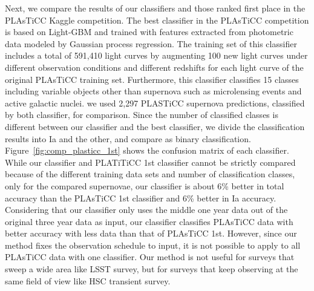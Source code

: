 \documentclass[useamsfonts]{pasj01}
\begin{document}
Next, we compare the results of our classifiers and those ranked first place in the PLAsTiCC Kaggle competition.
The best classifier in the PLAsTiCC competition \citep{Boone_2019} is based on Light-GBM and trained with features extracted from photometric data modeled by Gaussian process regression.
The training set of this classifier includes a total of 591,410 light curves by augmenting 100 new light curves under different observation conditions and different redshifts for each light curve of the original PLAsTiCC training set.
Furthermore, this classifier classifies 15 classes including variable objects other than supernova such as microlensing events and active galactic nuclei.
we used 2,297 PLASTiCC supernova predictions, classified by both classifier, for comparison.
Since the number of classified classes is different between our classifier and the best classifier, we divide the classification results into Ia and the other, and compare as binary classification.
Figure\ \ref{fig:comp_plasticc_1st} shows the confusion matrix of each classifier.
While our classifier and PLATiTiCC 1st classifier cannot be strictly compared because of the different training data sets and number of classification classes,
only for the compared supernovae, our classifier is about 6\% better in total accuracy than the PLAsTiCC 1st classifier and 6\% better in Ia accuracy.
Considering that our classifier only uses the middle one year data out of the original three year data as input, our classifier classifies PLAsTiCC data with better accuracy with less data than that of PLAsTiCC 1st.
However, since our method fixes the observation schedule to input, it is not possible to apply to all PLAsTiCC data with one classifier.
Our method is not useful for surveys that sweep a wide area like LSST survey, but for surveys that keep observing at the same field of view like HSC transient survey.
%
\end{document}
